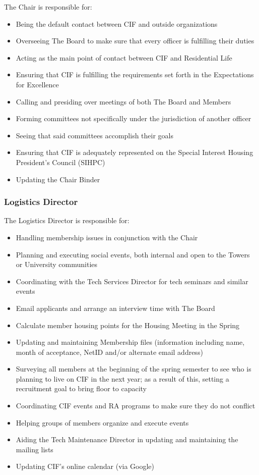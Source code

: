 The Chair is responsible for:
\begin{itemize}
	\item Being the default contact between CIF and outside organizations
	\item Overseeing The Board to make sure that every officer is fulfilling their duties
	\item Acting as the main point of contact between CIF and Residential Life
	\item Ensuring that CIF is fulfilling the requirements set forth in the Expectations for Excellence
	\item Calling and presiding over meetings of both The Board and Members
	\item Forming committees not specifically under the jurisdiction of another officer
	\item Seeing that said committees accomplish their goals
	\item Ensuring that CIF is adequately represented on the Special Interest Housing President’s Council (SIHPC)
	\item Updating the Chair Binder
\end{itemize}



		\subsubsection{Logistics Director}\label{ssub:logistics-director}

The Logistics Director is responsible for:
\begin{itemize}
	\item Handling membership issues in conjunction with the Chair
	\item Planning and executing social events, both internal and open to the Towers or University communities
	\item Coordinating with the Tech Services Director for tech seminars and similar events
	\item Email applicants and arrange an interview time with The Board
	\item Calculate member housing points for the Housing Meeting in the Spring
	\item Updating and maintaining Membership files (information including name, month of acceptance, NetID and/or alternate email address)
	\item Surveying all members at the beginning of the spring semester to see who is planning to live on CIF in the next year; as a result of this, setting a recruitment goal to bring floor to capacity
	\item Coordinating CIF events and RA programs to make sure they do not conflict
	\item Helping groups of members organize and execute events
	\item Aiding the Tech Maintenance Director in updating and maintaining the mailing lists
	\item Updating CIF's online calendar (via Google)
\end{itemize}



